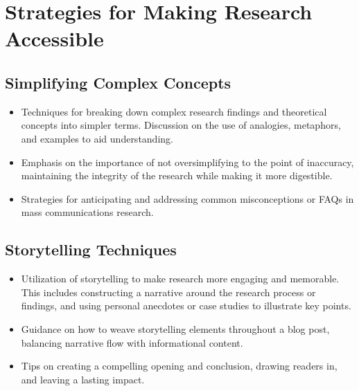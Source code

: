 \documentclass[
]{book}
\begin{document}
\hypertarget{strategies-for-making-research-accessible}{%
\section*{Strategies for Making Research Accessible}\label{strategies-for-making-research-accessible}}

\hypertarget{simplifying-complex-concepts}{%
\subsection*{Simplifying Complex Concepts}\label{simplifying-complex-concepts}}

\begin{itemize}
\item
  Techniques for breaking down complex research findings and theoretical concepts into simpler terms. Discussion on the use of analogies, metaphors, and examples to aid understanding.
\item
  Emphasis on the importance of not oversimplifying to the point of inaccuracy, maintaining the integrity of the research while making it more digestible.
\item
  Strategies for anticipating and addressing common misconceptions or FAQs in mass communications research.
\end{itemize}

\hypertarget{storytelling-techniques}{%
\subsection*{Storytelling Techniques}\label{storytelling-techniques}}

\begin{itemize}
\item
  Utilization of storytelling to make research more engaging and memorable. This includes constructing a narrative around the research process or findings, and using personal anecdotes or case studies to illustrate key points.
\item
  Guidance on how to weave storytelling elements throughout a blog post, balancing narrative flow with informational content.
\item
  Tips on creating a compelling opening and conclusion, drawing readers in, and leaving a lasting impact.
\end{itemize}
\end{document}
